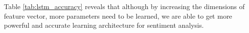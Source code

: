\documentclass[8pt,conference,compsocconf]{IEEEtran}
\begin{document}
Table \ref{tab:lstm_accuracy} reveals that although by increasing the dimensions of feature vector, more parameters need to be learned, we are able to get more powerful and accurate learning architecture for sentiment analysis.

%
%
%
\end{document}
